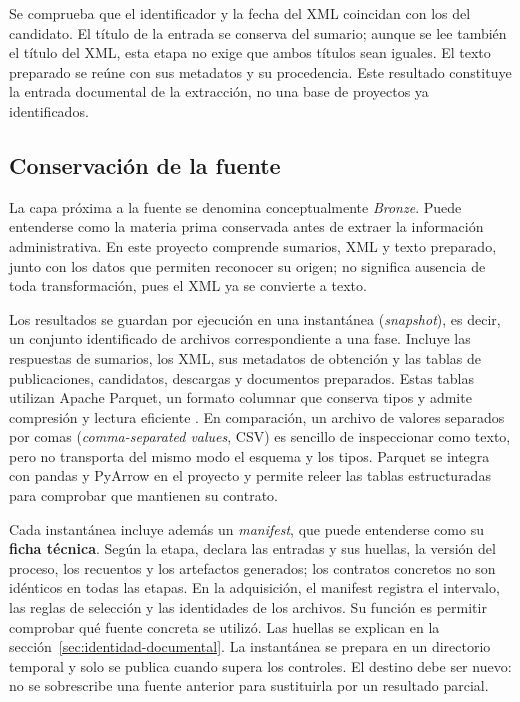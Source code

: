 Se comprueba que el identificador y la fecha del XML coincidan con los del
candidato. El título de la entrada se conserva del sumario; aunque se lee
también el título del XML, esta etapa no exige que ambos títulos sean iguales.
El texto preparado se reúne con sus metadatos y su procedencia.
Este resultado constituye la entrada documental de la extracción, no una
base de proyectos ya identificados.

\subsection{Conservación de la fuente}
La capa próxima a la fuente se denomina conceptualmente \emph{Bronze}.
Puede entenderse como la materia prima conservada antes de extraer la
información administrativa. En este proyecto comprende sumarios, XML y
texto preparado, junto con los datos que permiten reconocer su origen; no
significa ausencia de toda transformación, pues el XML ya se convierte a texto.

Los resultados se guardan por ejecución en una instantánea
(\textit{snapshot}),
es decir, un conjunto identificado de archivos correspondiente a una fase.
Incluye las respuestas de sumarios, los XML, sus metadatos de obtención y
las tablas de publicaciones, candidatos, descargas y documentos preparados.
Estas tablas utilizan Apache Parquet, un formato columnar que conserva tipos
y admite compresión y lectura eficiente \cite{apache_parquet_overview_2025}.
En comparación, un archivo de valores separados por comas
(\textit{comma-separated values}, CSV) es sencillo de inspeccionar como texto, pero no
transporta del mismo modo el esquema y los tipos. Parquet se integra con
pandas y PyArrow en el proyecto y permite releer las tablas estructuradas para
comprobar que mantienen su contrato.

Cada instantánea incluye además un \emph{manifest}, que puede entenderse como
su \textbf{ficha técnica}. Según la etapa, declara las entradas y sus huellas,
la versión del proceso, los recuentos y los artefactos generados; los contratos
concretos no son idénticos en todas las etapas. En la adquisición, el manifest
registra el intervalo, las reglas de selección y las identidades de los
archivos. Su función es permitir comprobar qué fuente concreta se utilizó.
Las huellas se explican en la sección~\ref{sec:identidad-documental}.
La instantánea se prepara en un directorio temporal y solo se publica cuando
supera los controles. El destino debe ser nuevo: no se sobrescribe una fuente
anterior para sustituirla por un resultado parcial.

